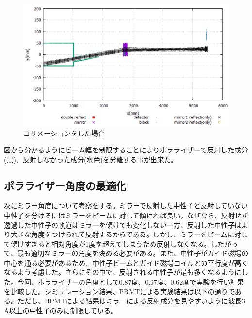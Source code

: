 \begin{figure}[H]
\centering
\includegraphics[keepaspectratio,scale=0.4]{angle/colimator.png}
\caption{コリメーションをした場合}
\end{figure}

図から分かるようにビーム幅を制限することによりポラライザーで反射した成分(黒)、反射しなかった成分(水色)を分離する事が出来た。

\subsection{ポラライザー角度の最適化}

次にミラー角度について考察をする。ミラーで反射した中性子と反射していない中性子を分けるにはミラーをビームに対して傾ければ良い。なぜなら、反射せず透過した中性子の軌道はミラーを傾けても変化しない一方、反射した中性子はより大きな角度をつけられて反射するからである。しかし、ミラーをビームに対して傾けすぎると相対角度が1度を超えてしまうため反射しなくなる。したがって、最も適切なミラーの角度を決める必要がある。また、中性子がガイド磁場の中心を通る必要があるため、中性子ビームとガイド磁場コイルとの平行度が高くなるよう考慮した。さらにその中で、反射される中性子が最も多くなるようにした。今回、ポラライザーの角度として$0.87$度、$0.67$度、$0.62$度で実験を行い結果を比較した。シミュレーション結果、PRMTによる実験結果は以下の通りである。ただし、RPMTによる結果はミラーによる反射成分を見やすいように波長3 Å以上の中性子のみに制限している。

